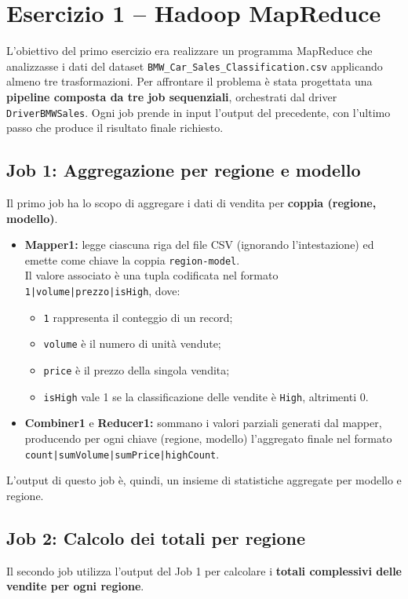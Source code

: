 \chapter{Esercizio 1 -- Hadoop MapReduce}
	L’obiettivo del primo esercizio era realizzare un programma MapReduce che analizzasse i dati del dataset \texttt{BMW\_Car\_Sales\_Classification.csv} applicando almeno tre trasformazioni.
	Per affrontare il problema è stata progettata una \textbf{pipeline composta da tre job sequenziali}, orchestrati dal driver \texttt{DriverBMWSales}.
	Ogni job prende in input l’output del precedente, con l’ultimo passo che produce il risultato finale richiesto.
	
	\section{Job 1: Aggregazione per regione e modello}
		Il primo job ha lo scopo di aggregare i dati di vendita per \textbf{coppia (regione, modello)}.
		
		\begin{itemize}
			\item \textbf{Mapper1:} legge ciascuna riga del file CSV (ignorando l’intestazione) ed emette come chiave la coppia \texttt{region-model}. \\
			Il valore associato è una tupla codificata nel formato \texttt{1|volume|prezzo|isHigh}, dove:
			\begin{itemize}
				\item \texttt{1} rappresenta il conteggio di un record;
				\item \texttt{volume} è il numero di unità vendute;
				\item \texttt{price} è il prezzo della singola vendita;
				\item \texttt{isHigh} vale 1 se la classificazione delle vendite è \texttt{High}, altrimenti 0.
			\end{itemize}
			
			\item \textbf{Combiner1} e \textbf{Reducer1:} sommano i valori parziali generati dal mapper, producendo per ogni chiave (regione, modello) l’aggregato finale nel formato \texttt{count|sumVolume|sumPrice|highCount}.
		\end{itemize}
		
		L’output di questo job è, quindi, un insieme di statistiche aggregate per modello e regione.
	
	\section{Job 2: Calcolo dei totali per regione}
		Il secondo job utilizza l’output del Job 1 per calcolare i \textbf{totali complessivi delle vendite per ogni regione}.
		
